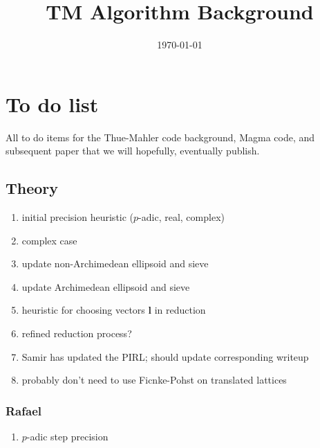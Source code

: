 \documentclass[11pt]{report}
\title{TM Algorithm Background}
\author{}
\date{\today}
\theoremstyle{definition}
\begin{document}
\maketitle
\tableofcontents


\chapter{To do list}
\label{cha:do-list}

All to do items for the Thue-Mahler code background, Magma code, and subsequent paper that we will hopefully, eventually publish.


\section{Theory}
\label{sec:theory}

\begin{enumerate}[\hspace{0.5cm}1.]
\itemsep0em
\item initial precision heuristic ($p$-adic, real, complex)
\item complex case
\item update non-Archimedean ellipsoid and sieve
\item update Archimedean ellipsoid and sieve
\item heuristic for choosing vectors $\mathbf{l}$ in reduction
\item refined reduction process?
\item Samir has updated the PIRL; should update corresponding writeup
\item probably don't need to use Ficnke-Pohst on translated lattices
\end{enumerate}


\subsection{Rafael}
\label{subsec:rafael}

\begin{enumerate}[\hspace{0.5cm}1.]
\itemsep0em
\item $p$-adic step precision
\end{enumerate}
\end{document}
